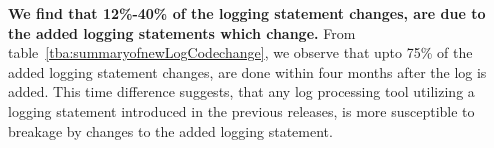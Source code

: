 \textbf{We find that 12\%-40\% of the logging statement changes, are due to the added logging statements which change.} From table~\ref{tba:summaryofnewLogCodechange}, we observe that upto 75\% of the added logging statement changes, are done within four months after the log is added. This time difference suggests, that any log processing tool utilizing a logging statement introduced in the previous releases, is more susceptible to breakage by changes to the added logging statement.  














